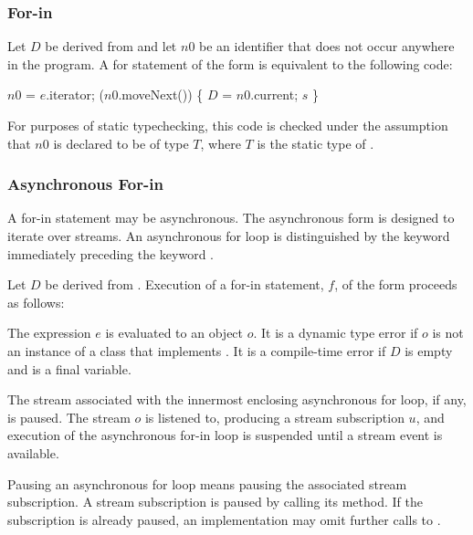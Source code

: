 \documentclass[makeidx]{article}
\begin{document}
{\subsubsection{For-in}

\LMHash{}%
Let $D$ be derived from 
and let $n0$ be an identifier that does not occur anywhere in the program.
A for statement of the form  is equivalent to the following code:

\begin{dartCode}
\VAR{} $n0$ = $e$.iterator;
\WHILE{} ($n0$.moveNext()) \{
   $D$ \id{} = $n0$.current;
   $s$
\}
\end{dartCode}

For purposes of static typechecking,
this code is checked under the assumption that $n0$ is declared to be of type $T$,
where $T$ is the static type of .



\subsubsection{Asynchronous For-in}

\LMHash{}%
A for-in statement may be asynchronous.
The asynchronous form is designed to iterate over streams.
An asynchronous for loop is distinguished by the keyword \AWAIT{} immediately preceding the keyword \FOR.

\LMHash{}%
Let $D$ be derived from .
Execution of a for-in statement, $f$, of the form
proceeds as follows:

\LMHash{}%
The expression $e$ is evaluated to an object $o$.
It is a dynamic type error if $o$ is not an instance of a class that implements .
It is a compile-time error if $D$ is empty and \id{} is a final variable.

\LMHash{}%
The stream associated with the innermost enclosing asynchronous for loop, if any, is paused.
The stream $o$ is listened to, producing a stream subscription $u$,
and execution of the asynchronous for-in loop is suspended
until a stream event is available.

Pausing an asynchronous for loop means pausing the associated stream subscription.
A stream subscription is paused by calling its  method.
If the subscription is already paused, an implementation may omit further calls to .

}
\end{document}
